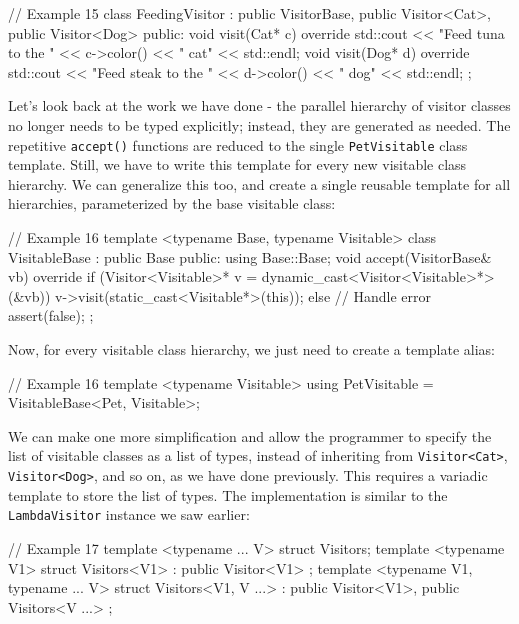 \begin{code}
// Example 15
class FeedingVisitor : public VisitorBase,
                       public Visitor<Cat>,
                       public Visitor<Dog>
{
  public:
  void visit(Cat* c) override {
    std::cout << "Feed tuna to the " << c->color()
              << " cat" << std::endl;
  }
  void visit(Dog* d) override {
    std::cout << "Feed steak to the " << d->color()
              << " dog" << std::endl;
  }
};
\end{code}

Let's look back at the work we have done - the parallel hierarchy of visitor classes no longer needs to be typed explicitly; instead, they are generated as needed. The repetitive \texttt{accept()} functions are reduced to the single \texttt{PetVisitable} class template. Still, we have to write this template for every new visitable class hierarchy. We can generalize this too, and create a single reusable template for all hierarchies, parameterized by the base visitable class:

\begin{code}
// Example 16
template <typename Base, typename Visitable>
class VisitableBase : public Base {
  public:
  using Base::Base;
  void accept(VisitorBase& vb) override {
    if (Visitor<Visitable>* v = 
        dynamic_cast<Visitor<Visitable>*>(&vb)) {
      v->visit(static_cast<Visitable*>(this));
    } else { // Handle error
      assert(false);
    }
  }
};
\end{code}

Now, for every visitable class hierarchy, we just need to create a template alias:

\begin{code}
// Example 16
template <typename Visitable>
using PetVisitable = VisitableBase<Pet, Visitable>;
\end{code}

We can make one more simplification and allow the programmer to specify the list of visitable classes as a list of types, instead of inheriting from \texttt{Visitor\textless{}Cat\textgreater{}}, \texttt{Visitor\textless{}Dog\textgreater{}}, and so on, as we have done previously. This requires a variadic template to store the list of types. The implementation is similar to the \texttt{LambdaVisitor} instance we saw earlier:

\begin{code}
// Example 17
template <typename ... V> struct Visitors;
template <typename V1>
struct Visitors<V1> : public Visitor<V1> {};
template <typename V1, typename ... V>
struct Visitors<V1, V ...> : public Visitor<V1>,
                             public Visitors<V ...> {};
\end{code}

